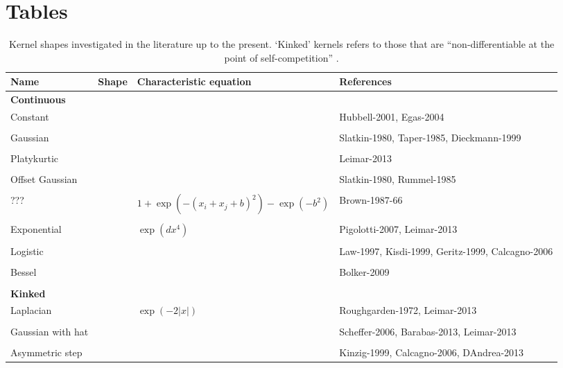 \documentclass[a4paper,11pt]{article}
\begin{document}
\section{Tables}


\begin{table}[h]
 \caption{Kernel shapes investigated in the literature up to the present.
`Kinked' kernels refers to those that are ``non-differentiable at the point of
self-competition'' \citep{Barabas-2012}.}
\centering
{\footnotesize
  \begin{tabular}{p{3cm}p{4cm}p{3cm}p{4cm}}
  \hline
  Name & Shape & Characteristic equation & References \\
  \hline
  \multicolumn{4}{l}{\textbf{Continuous}} \\
  Constant & & & Hubbell-2001, Egas-2004 \\ \\
  Gaussian & & & Slatkin-1980, Taper-1985,
  Dieckmann-1999\\ \\
  Platykurtic & & &  Leimar-2013 \\ \\
  Offset Gaussian & & & Slatkin-1980, Rummel-1985\\ \\
  ??? & & $1 + \exp(-(x_i + x_j + b)^2) - \exp(-b^2)$ & Brown-1987-66 \\ \\
  Exponential & & $\exp(dx^4)$ &Pigolotti-2007, Leimar-2013\\ \\
  Logistic & & & Law-1997, Kisdi-1999, Geritz-1999, Calcagno-2006\\ \\
  Bessel & & & Bolker-2009\\ \\
 \multicolumn{4}{l}{\textbf{Kinked}} \\
  Laplacian & & $\exp(-2|x|)$ & Roughgarden-1972, Leimar-2013 \\ \\
  Gaussian with hat & & & Scheffer-2006, Barabas-2013, Leimar-2013 \\ \\
  Asymmetric step & & & Kinzig-1999, Calcagno-2006, DAndrea-2013 \\
  \hline
  \end{tabular}
}
\label{tab:shapes}
\end{table}

\clearpage
\end{document}
